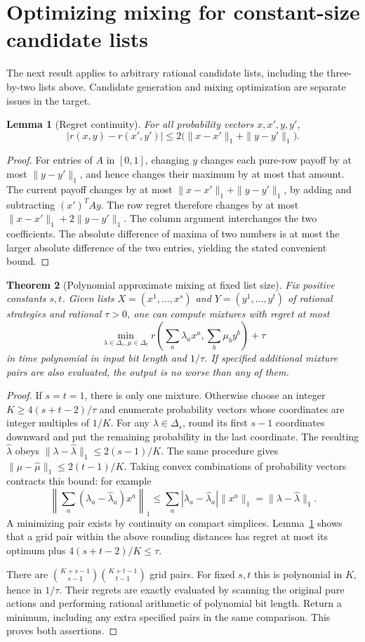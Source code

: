 \documentclass[11pt]{article}
\newtheorem{theorem}{Theorem}
\newtheorem{lemma}[theorem]{Lemma}
\theoremstyle{definition}
\begin{document}
\section{Optimizing mixing for constant-size candidate lists}
The next result applies to arbitrary rational candidate lists, including
the three-by-two lists above. Candidate generation and mixing optimization
are separate issues in the target.
\begin{lemma}[Regret continuity]\label{lip}
For all probability vectors $x,x',y,y'$,
\[
 |r(x,y)-r(x',y')|\le2\bigl(\|x-x'\|_1+\|y-y'\|_1\bigr).
\]
\end{lemma}
\begin{proof}
For entries of $A$ in $[0,1]$, changing $y$ changes each pure-row payoff
by at most $\|y-y'\|_1$, and hence changes their maximum by at most that
amount. The current payoff changes by at most
$\|x-x'\|_1+\|y-y'\|_1$, by adding and subtracting $(x')^TAy$.
The row regret therefore changes by at most
$\|x-x'\|_1+2\|y-y'\|_1$. The column argument interchanges the two
coefficients. The absolute difference of maxima of two numbers is at
most the larger absolute difference of the two entries, yielding the
stated convenient bound.
\end{proof}
\begin{theorem}[Polynomial approximate mixing at fixed list size]\label{grid}
Fix positive constants $s,t$. Given lists $X=(x^1,\ldots,x^s)$ and
$Y=(y^1,\ldots,y^t)$ of rational strategies and rational $\tau>0$, one
can compute mixtures with regret at most
\[
 \min_{\lambda\in\Delta_s,\mu\in\Delta_t}
 r\left(\sum_a\lambda_ax^a,\sum_b\mu_by^b\right)+\tau
\]
in time polynomial in input bit length and $1/\tau$. If specified
additional mixture pairs are also evaluated, the output is no worse than
any of them.
\end{theorem}
\begin{proof}
If $s=t=1$, there is only one mixture. Otherwise choose an integer
$K\ge4(s+t-2)/\tau$ and enumerate probability vectors whose coordinates
are integer multiples of $1/K$. For any $\lambda\in\Delta_s$, round its
first $s-1$ coordinates downward and put the remaining probability in
the last coordinate. The resulting $\widehat\lambda$ obeys
$\|\lambda-\widehat\lambda\|_1\le2(s-1)/K$. The same procedure gives
$\|\mu-\widehat\mu\|_1\le2(t-1)/K$. Taking convex combinations of
probability vectors contracts this bound: for example
\[
 \left\|\sum_a(\lambda_a-\widehat\lambda_a)x^a\right\|_1
 \le\sum_a|\lambda_a-\widehat\lambda_a|\|x^a\|_1
 =\|\lambda-\widehat\lambda\|_1.
\]
A minimizing pair exists by continuity on compact simplices.
Lemma~\ref{lip} shows that a grid pair within the above rounding distances
has regret at most its optimum plus $4(s+t-2)/K\le\tau$.

There are $\binom{K+s-1}{s-1}\binom{K+t-1}{t-1}$ grid pairs.
For fixed $s,t$ this is polynomial in $K$, hence in $1/\tau$. Their
regrets are exactly evaluated by scanning the original pure actions and
performing rational arithmetic of polynomial bit length. Return a minimum,
including any extra specified pairs in the same comparison. This proves
both assertions.
\end{proof}
\end{document}
